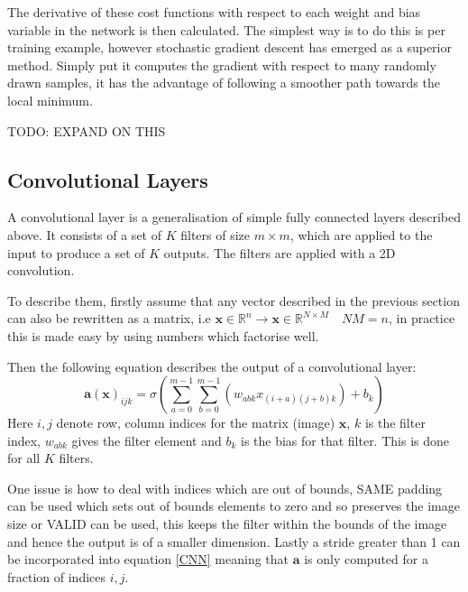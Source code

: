       The derivative of these cost functions with respect to each weight and bias variable
      in the network is then calculated.
      The simplest way is to do this is per training example, however stochastic gradient
      descent\cite{Amari1993} has emerged as a superior method. Simply put it computes the gradient with respect
      to many randomly drawn samples, it has the advantage of following a smoother path
      towards the local minimum.

      TODO: EXPAND ON THIS
    \subsection{Convolutional Layers}
      A convolutional layer is a generalisation of simple fully connected layers described
      above. It consists of a set of $K$ filters of size $m\times m$, which are applied to the input to produce
      a set of $K$ outputs. The filters are applied with a 2D convolution.


      To describe them, firstly assume that any vector described in the previous section
      can also be rewritten as a matrix, i.e $\mathbf{x} \in \mathbb{R}^{n}
      \rightarrow \mathbf{x} \in \mathbb{R}^{N \times M} \quad NM=n$, in practice this is made
      easy by using numbers which factorise well.

      Then the following equation describes the output of a convolutional layer:
      \begin{equation} \label{CNN}
        \mathbf{a}(\mathbf{x})_{ijk} = \sigma \left ( \sum_{a=0}^{m-1}\sum_{b=0}^{m-1}(w_{abk}x_{(i+a)(j+b)k}) + b_k \right )
      \end{equation}
      Here $i,j$  denote row, column indices for the matrix (image) $\mathbf{x}$, $k$ is the filter index, $w_{abk}$
      gives the filter element and $b_k$ is the bias for that filter. This is done for all $K$ filters.

      One issue is how to deal with indices which are out of bounds, SAME padding can be used which sets out of bounds
      elements to zero and so preserves the image size or VALID can be used, this keeps the filter within the bounds of the
      image and hence the output is of a smaller dimension. Lastly a stride greater than 1 can be incorporated into equation
      \ref{CNN} meaning that $\mathbf{a}$ is only computed for a fraction of indices $i,j$.
